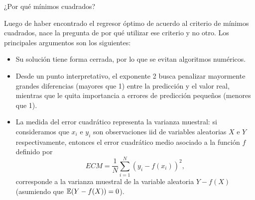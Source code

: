 \documentclass[handout, 9pt]{beamer}
\begin{document}
\begin{frame}{¿Por qué mínimos cuadrados?}

Luego de haber encontrado el regresor óptimo de acuerdo al criterio de mínimos cuadrados, nace la pregunta de por qué utilizar ese criterio y no otro. Los principales argumentos son los siguientes: \pause

\begin{itemize}
	\item Su solución tiene forma cerrada, por lo que se evitan algoritmos numéricos.\pause
	\item Desde un punto interpretativo, el exponente 2 busca penalizar mayormente grandes diferencias (mayores que 1) entre la predicción y el valor real, mientras que le quita importancia a errores de predicción pequeños (menores que 1).\pause
	\item La medida del error cuadrático representa la varianza muestral: si consideramos que $x_i$ e $y_i$ son observaciones iid de variables aleatorias $X$ e $Y$ respectivamente, entonces el error cuadrático medio asociado a la función $f$ definido por
\begin{equation*}
	ECM = \frac{1}{N}\sum_{i=1}^N (y_i-f(x_i))^2,
\end{equation*}
corresponde a la varianza muestral de la variable aleatoria $Y-f(X)$ (asumiendo que $\operatorname{\mathbb{E}}(Y-f(X))=0$).
\end{itemize}

\end{frame}
\end{document}
